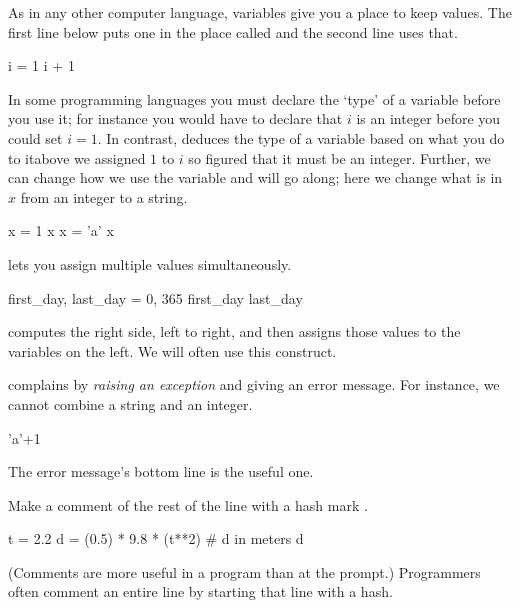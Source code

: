 As in any other computer language, variables give you a place to keep values.
The first line below puts one in the place called 
and the second line uses that.
\begin{pythonconsole}
i = 1
i + 1
\end{pythonconsole}
In some programming languages you must declare the `type' of a variable
before you use it; for instance you would have to declare 
that $i$ is an integer before you could set $i=1$.
In contrast, \python{} deduces the type of a variable 
based on what you do to it\Dash above we assigned $1$ to $i$ 
so \python{} figured that it must be an integer.
Further, we can change how we use the variable and \python{} will 
go along; here we change what is in $x$ from an integer to a string.
\begin{pythonconsole}
x = 1
x
x = 'a'
x
\end{pythonconsole}

\python{} lets you assign multiple values simultaneously.
\begin{pythonconsole}
first_day, last_day = 0, 365
first_day
last_day   
\end{pythonconsole}
\noindent
\python{} computes the right side, left to right, and then assigns 
those values to the variables on the left.
We will often use this construct.

\python{} complains by \textit{raising an exception} and giving an error 
message.
For instance, we cannot combine a string and an integer. 
\begin{pythonconsole}
'a'+1
\end{pythonconsole}
\noindent The error message's bottom line is the useful one.

Make a comment of the rest of the line with a hash mark \inlinecode{\#}.
\begin{pythonconsole}
t = 2.2
d = (0.5) * 9.8 * (t**2)  # d in meters
d
\end{pythonconsole}
\noindent (Comments are more useful in a program than at the prompt.)
Programmers often comment an entire line by starting 
that line with a hash. 


